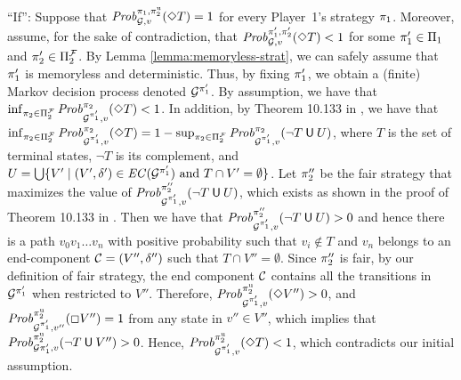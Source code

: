 \begin{myproof}
``If'': Suppose that $\mathit{Prob}^{\pi_{1}, \pi^{\mathrm{u}}_{2}}_{\mathcal{G},v}(\Diamond T)=1$ for every Player~1's strategy $\pi_{1}$.  Moreover, 
assume, for the sake of contradiction, that
$\mathit{Prob}^{\pi_{1}', \pi_{2}'}_{\mathcal{G},v}(\Diamond T) < 1$ for some  $\pi_{1}'\in \Pi_{1}$ and $\pi_{2}'\in \Pi^{\mathcal{F}}_{2}$. 
By Lemma \ref{lemma:memoryless-strat}, we can safely assume that $\pi_{1}'$ is memoryless and deterministic.
Thus, by fixing $\pi_{1}'$, we obtain a (finite) Markov decision process denoted $\mathcal{G}^{\pi_{1}'}$.
By assumption, we have that
$\inf_{\pi_{2} \in \Pi^{\mathcal{F}}_{2}} \mathit{Prob}^{\pi_{2}}_{\mathcal{G}^{\pi_{1}'},v}(\Diamond T) < 1 $. In addition, by Theorem 10.133 in \cite{BaierK08}, we have that $\inf_{ \pi_{2} \in \Pi^{\mathcal{F}}_{2}}\mathit{Prob}^{\pi_{2}}_{\mathcal{G}^{\pi_{1}'},v}(\Diamond T) = 1 - \sup_{\pi_{2} \in \Pi^{\mathcal{F}}_{2}} \mathit{Prob}^{\pi_{2}}_{\mathcal{G}^{\pi_{1}'},v}(\neg T \mathbin{\textsf{U}} U)$, where $T$ is the set of terminal states,  $\neg T$ is its complement, and
$U = \bigcup \{ V' \mid (V', \delta') \in \mathit{EC}(\mathcal{G}^{\pi_{1}'}) \text{ and }  T \cap V' = \emptyset\}$.
Let $\pi_{2}''$ be the fair strategy that maximizes the value of $\mathit{Prob}^{\pi_{2}''}_{\mathcal{G}^{\pi_{1}'},v}(\neg T \mathbin{\textsf{U}} U)$, which exists as shown in the proof of Theorem 10.133 in \cite{BaierK08}.
Then we have that $\mathit{Prob}^{\pi_{2}''}_{\mathcal{G}^{\pi_{1}'},v}(\neg T \mathbin{\textsf{U}} U) > 0$ and hence
there is a path $v_0 v_1 \dots v_n$ with positive probability such that $v_i \notin T$ and $v_n$ belongs to an end-component $\mathcal{C} = (V'', \delta'')$
such that $T \cap V'' = \emptyset$. Since $\pi_{2}''$ is fair, by our definition of fair strategy, the end component $\mathcal{C}$ contains all the 
transitions in $\mathcal{G}^{\pi_{1}'}$ when restricted  to $V''$.
Therefore, $\mathit{Prob}^{\pi^{\mathrm{u}}_{2}}_{\mathcal{G}^{\pi_{1}'},v}(\Diamond V'') > 0$, and 
$\mathit{Prob}^{\pi^{\mathrm{u}}_{2}}_{\mathcal{G}^{\pi_{1}'},v''}(\Box V'') = 1 $ 
from any state in $v'' \in V''$, which implies that $\mathit{Prob}^{\pi^{\mathrm{u}}_{2}}_{\mathcal{G}{\pi_{1}'},v}(\neg T \mathbin{\textsf{U}} V'') > 0$. 
Hence, $\mathit{Prob}^{\pi^{\mathrm{u}}_{2}}_{\mathcal{G}^{\pi_{1}'},v}(\Diamond T) < 1$, which contradicts our initial assumption.


\end{myproof}

